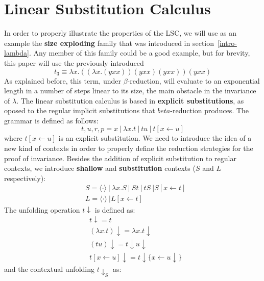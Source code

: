 \documentclass[11pt]{article}
\begin{document}
\section{Linear Substitution Calculus}
In order to properly illustrate the properties of the LSC, we will use as an example the \textbf{size exploding} family that was introduced in section~\ref{intro-lambda}. Any member of this family could be a good example, but for brevity, this paper will use the previously introduced 
\begin{equation}
	t_{3} \equiv \lambda x.((\lambda x. (yxx))(yxx)(yxx))(yxx)
\end{equation}
As explained before, this term, under $\beta$-reduction, will evaluate to an exponential length in a number of steps linear to its size, the main obstacle in the invariance of $\lambda$.
The linear substitution calculus is based in \textbf{explicit substitutions}, as oposed to the regular implicit substitutions that $beta$-reduction produces. The grammar is defined as follows:
\begin{equation}
  t, u, r, p = x \ | \ \lambda x.t \ | \ tu \ | \ t[x \leftarrow u]
\end{equation}
where $t[x \leftarrow u]$ is an explicit substitution.
We need to introduce the idea of a new kind of contexts in order to properly define the reduction strategies for the proof of invariance. Besides the addition of explicit substitution to regular contexts, we introduce \textbf{shallow} and \textbf{substitution} contexts ($S$ and $L$ respectively):
\begin{equation}
  \begin{split}
    &S = \langle \cdot \rangle \ | \ \lambda x.S \ | \ St \ | \ tS \ | S[x \leftarrow t] \\
    &L = \langle \cdot \rangle \ | L[x \leftarrow t]
  \end{split}
\end{equation}
The unfolding operation $t\downarrow$ is defined as:
\begin{equation}
  \begin{split}
    &t\downarrow = t \\
    &(\lambda x .t)\downarrow = \lambda x.t\downarrow \\
    &(tu)\downarrow = t\downarrow u \downarrow \\
    &t[x \leftarrow u]\downarrow = t\downarrow \{x \leftarrow u \downarrow \}
  \end{split}
\end{equation}
and the contextual unfolding $t\downarrow_S$ as:
\end{document}
